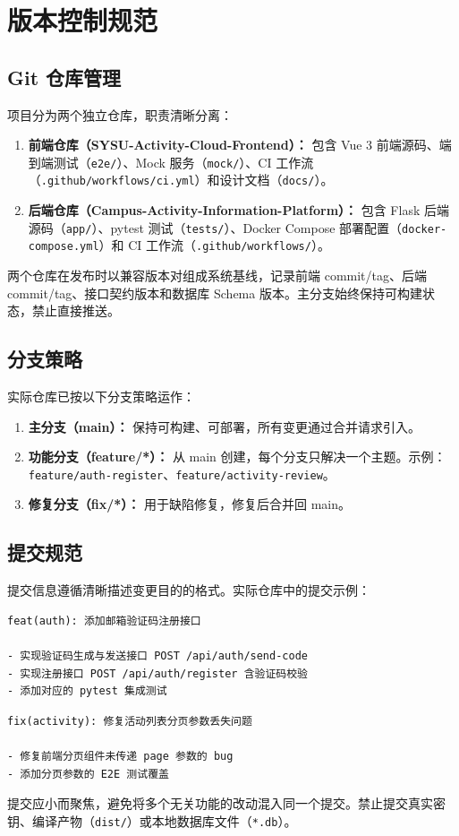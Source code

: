 \documentclass[12pt,a4paper]{ctexart}
\begin{document}
\section{版本控制规范}
\subsection{Git 仓库管理}
项目分为两个独立仓库，职责清晰分离：
\begin{enumerate}
\item \textbf{前端仓库（SYSU-Activity-Cloud-Frontend）：} 包含 Vue 3 前端源码、端到端测试（\texttt{e2e/}）、Mock 服务（\texttt{mock/}）、CI 工作流（\texttt{.github/workflows/ci.yml}）和设计文档（\texttt{docs/}）。
\item \textbf{后端仓库（Campus-Activity-Information-Platform）：} 包含 Flask 后端源码（\texttt{app/}）、pytest 测试（\texttt{tests/}）、Docker Compose 部署配置（\texttt{docker-compose.yml}）和 CI 工作流（\texttt{.github/workflows/}）。
\end{enumerate}
两个仓库在发布时以兼容版本对组成系统基线，记录前端 commit/tag、后端 commit/tag、接口契约版本和数据库 Schema 版本。主分支始终保持可构建状态，禁止直接推送。

\subsection{分支策略}
实际仓库已按以下分支策略运作：
\begin{enumerate}
\item \textbf{主分支（main）：} 保持可构建、可部署，所有变更通过合并请求引入。
\item \textbf{功能分支（feature/*）：} 从 main 创建，每个分支只解决一个主题。示例：\texttt{feature/auth-register}、\texttt{feature/activity-review}。
\item \textbf{修复分支（fix/*）：} 用于缺陷修复，修复后合并回 main。
\end{enumerate}

\subsection{提交规范}
提交信息遵循清晰描述变更目的的格式。实际仓库中的提交示例：
\begin{verbatim}
feat(auth): 添加邮箱验证码注册接口

- 实现验证码生成与发送接口 POST /api/auth/send-code
- 实现注册接口 POST /api/auth/register 含验证码校验
- 添加对应的 pytest 集成测试
\end{verbatim}
\begin{verbatim}
fix(activity): 修复活动列表分页参数丢失问题

- 修复前端分页组件未传递 page 参数的 bug
- 添加分页参数的 E2E 测试覆盖
\end{verbatim}
提交应小而聚焦，避免将多个无关功能的改动混入同一个提交。禁止提交真实密钥、编译产物（\texttt{dist/}）或本地数据库文件（\texttt{*.db}）。
\end{document}

